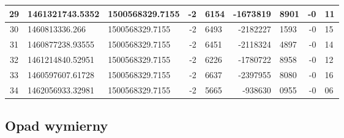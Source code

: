 \begin{table}[!ht]
\begin{center}
\begin{tabular}{|c|l|l|r@{.}l|r@{.}l|r@{.}l|}
29  &     1461321743.5352    &    1500568329.7155    &      -2 & 6154  &       -1673819 & 8901   &    -0 & 11 \\ \hline
30  &     1460813336.266     &    1500568329.7155    &      -2 & 6493  &       -2182227 & 1593   &    -0 & 15 \\ \hline
31  &     1460877238.93555   &    1500568329.7155    &      -2 & 6451  &       -2118324 & 4897   &    -0 & 14 \\ \hline
32  &     1461214840.52951   &    1500568329.7155    &      -2 & 6226  &       -1780722 & 8958   &    -0 & 12 \\ \hline
33  &     1460597607.61728   &    1500568329.7155    &      -2 & 6637  &       -2397955 & 8080   &    -0 & 16 \\ \hline
34  &     1462056933.32981   &    1500568329.7155    &      -2 & 5665  &        -938630 & 0955   &    -0 & 06 \\ \hline



\end{tabular}
\end{center}
\end{table}


\subsection{Opad wymierny}

